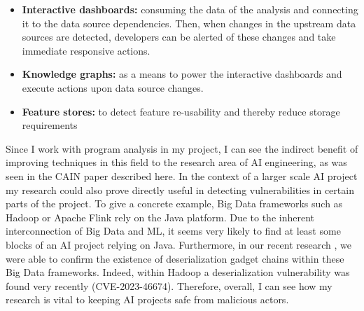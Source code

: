 \documentclass[11pt]{article}
\begin{document}
\begin{itemize}
    \item \textbf{Interactive dashboards:} consuming the data of the analysis and connecting it to the data source dependencies. Then, when changes in the upstream data sources are detected, developers can be alerted of these changes and take immediate responsive actions.
    \item \textbf{Knowledge graphs:} as a means to power the interactive dashboards and execute actions upon data source changes.
    \item \textbf{Feature stores:} to detect feature re-usability and thereby reduce storage requirements
\end{itemize}

Since I work with program analysis in my project, I can see the indirect benefit of improving techniques in this field to the research area of AI engineering, as was seen in the CAIN paper described here. In the context of a larger scale AI project my research could also prove directly useful in detecting vulnerabilities in certain parts of the project. To give a concrete example, Big Data frameworks such as Hadoop or Apache Flink rely on the Java platform. Due to the inherent interconnection of Big Data and ML, it seems very likely to find at least some blocks of an AI project relying on Java. Furthermore, in our recent research \cite{kreysig_analyzing_2024}, we were able to confirm the existence of deserialization gadget chains within these Big Data frameworks. Indeed, within Hadoop a deserialization vulnerability was found very recently (CVE-2023-46674). Therefore, overall, I can see how my research is vital to keeping AI projects safe from malicious actors. 


\clearpage
{}
\printbibliography
\end{document}
